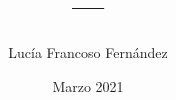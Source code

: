 \documentclass[12pt]{article}
\begin{document}
	\title{---}
	\author{Lucía Francoso Fernández}
	\date{Marzo 2021}
	
	\maketitle
	\pagebreak
	
\end{document}
